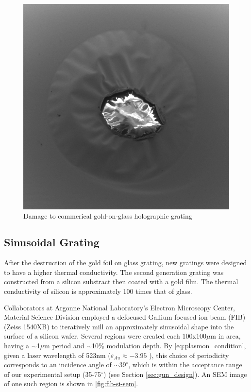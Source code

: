 \begin{figure}
  \centering
  \includegraphics{damage.png}
  \caption{Damage to commerical gold-on-glass holographic grating}
  \label{fig:grating-damage}
\end{figure}

\subsection{Sinusoidal Grating}

After the destruction of the gold foil on glass grating, new gratings were designed to have a higher thermal conductivity.
The second generation grating was constructed from a silicon substract then coated with a gold film.
The thermal conductivity of silicon is approximately 100 times that of glass. %

Collaborators at Argonne National Laboratory's Electron Microscopy Center, Material Science Division employed a defocused Gallium focused ion beam (FIB) (Zeiss 1540XB) to iteratively mill an approximately sinusoidal shape into the surface of a silicon wafer.
Several regions were created each 100x100$\mu$m in area, having a $\sim$1$\mu$m period and $\sim$10\% modulation depth.
By \ref{eq:plasmon_condition}, given a laser wavelength of 523nm ($\varepsilon_{Au} \approx -3.95$ \cite{johnson_optical_1972}), this choice of periodicity corresponds to an incidence angle of $\sim39^{\circ}$, which is within the acceptance range of our experimental setup (35-75$^{\circ}$) (see Section \ref{sec:gun_design}).
An SEM image of one such region is shown in \ref{fig:fib-si-sem}.

